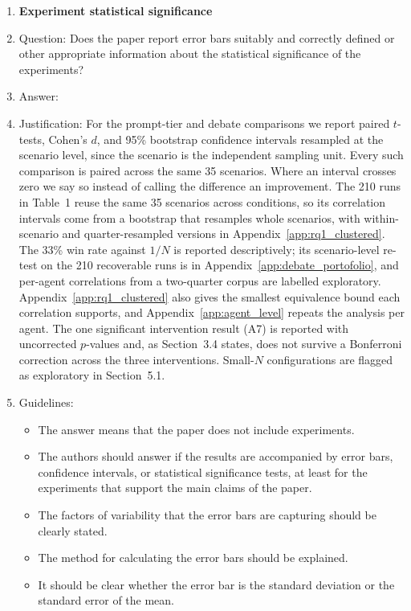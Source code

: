 \begin{enumerate}
\item {\bf Experiment statistical significance}
    \item[] Question: Does the paper report error bars suitably and correctly defined or other appropriate information about the statistical significance of the experiments?
    \item[] Answer: \answerYes{}
    \item[] Justification: For the prompt-tier and debate comparisons we report paired $t$-tests, Cohen's $d$, and 95\% bootstrap confidence intervals resampled at the scenario level, since the scenario is the independent sampling unit. Every such comparison is paired across the same 35 scenarios. Where an interval crosses zero we say so instead of calling the difference an improvement. The 210 runs in Table~1 reuse the same 35 scenarios across conditions, so its correlation intervals come from a bootstrap that resamples whole scenarios, with within-scenario and quarter-resampled versions in Appendix~\ref{app:rq1_clustered}. The 33\% win rate against $1/N$ is reported descriptively; its scenario-level re-test on the 210 recoverable runs is in Appendix~\ref{app:debate_portofolio}, and per-agent correlations from a two-quarter corpus are labelled exploratory. Appendix~\ref{app:rq1_clustered} also gives the smallest equivalence bound each correlation supports, and Appendix~\ref{app:agent_level} repeats the analysis per agent. The one significant intervention result (A7) is reported with uncorrected $p$-values and, as Section~3.4 states, does not survive a Bonferroni correction across the three interventions. Small-$N$ configurations are flagged as exploratory in Section~5.1.
    \item[] Guidelines:
    \begin{itemize}
        \item The answer \answerNA{} means that the paper does not include experiments.
        \item The authors should answer \answerYes{} if the results are accompanied by error bars, confidence intervals, or statistical significance tests, at least for the experiments that support the main claims of the paper.
        \item The factors of variability that the error bars are capturing should be clearly stated.
        \item The method for calculating the error bars should be explained.
        \item It should be clear whether the error bar is the standard deviation or the standard error of the mean.
    \end{itemize}


\end{enumerate}
